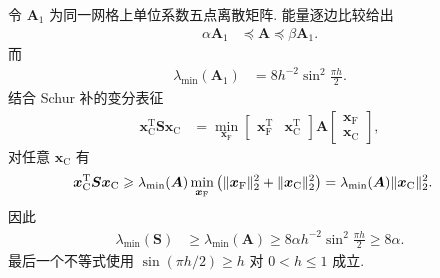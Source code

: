 \documentclass{ctexart}
\newcommand{\T}{\mathrm{T}}
\renewcommand{\ge}{\geqslant}
\renewcommand{\le}{\leqslant}
\DeclarePairedDelimiter\norm{\lVert}{\rVert}
\begin{document}
令 $\bm A_1$ 为同一网格上单位系数五点离散矩阵. 能量逐边比较给出
\begin{align}
    \alpha\bm A_1&\preceq\bm A\preceq\beta\bm A_1.
    \label{eq:coefficient-loewner-comparison}
\end{align}
而
\begin{align}
    \lambda_{\min}(\bm A_1)
    &=8h^{-2}\sin^2\frac{\pi h}{2}.
    \label{eq:laplacian-min-eigenvalue}
\end{align}
结合 Schur 补的变分表征
\begin{align}
    \bm x_{\mathrm C}^\T\bm S\bm x_{\mathrm C}
    &=\min_{\bm x_{\mathrm F}}
      \begin{bmatrix}\bm x_{\mathrm F}^\T&\bm x_{\mathrm C}^\T\end{bmatrix}
      \bm A
      \begin{bmatrix}\bm x_{\mathrm F}\\\bm x_{\mathrm C}\end{bmatrix},
    \label{eq:schur-variational-characterization}
\end{align}
对任意 $\bm x_{\mathrm C}$ 有
\begin{align}
    \bm x_{\mathrm C}^\T\bm S\bm x_{\mathrm C}
    &\ge \lambda_{\min}(\bm A)
      \min_{\bm x_{\mathrm F}}
      \left(\norm{\bm x_{\mathrm F}}_2^2+\norm{\bm x_{\mathrm C}}_2^2\right)
     =\lambda_{\min}(\bm A)\norm{\bm x_{\mathrm C}}_2^2.
    \label{eq:schur-lambda-via-A}
\end{align}
因此
\begin{align}
    \lambda_{\min}(\bm S)
    &\ge\lambda_{\min}(\bm A)
     \ge8\alpha h^{-2}\sin^2\frac{\pi h}{2}
     \ge8\alpha.
    \label{eq:schur-lambda-explicit-lower}
\end{align}
最后一个不等式使用 $\sin(\pi h/2)\ge h$ 对 $0<h\le1$ 成立.
\end{document}
